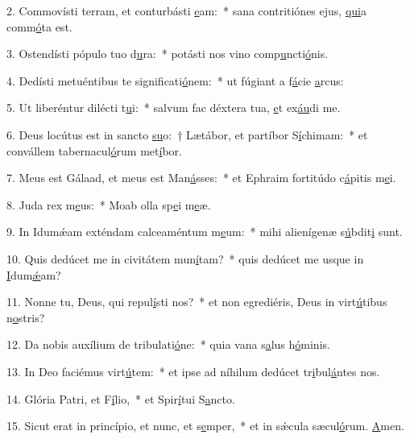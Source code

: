 2. Commovísti terram, et conturbásti \uline{e}am:~* sana contritiónes ejus, \uline{qui}a comm\uline{ó}ta est.\par 
3. Ostendísti pópulo tuo d\uline{u}ra:~* potásti nos vino comp\uline{u}ncti\uline{ó}nis.\par 
4. Dedísti metuéntibus te significati\uline{ó}nem:~* ut fúgiant a f\uline{á}cie \uline{a}rcus:\par 
5. Ut liberéntur dilécti t\uline{u}i:~* salvum fac déxtera tua, \uline{e}t ex\uline{áu}di me.\par 
6. Deus locútus est in sancto \uline{su}o:~† Lætábor, et partíbor S\uline{í}chimam:~* et convállem tabernacul\uline{ó}rum met\uline{í}bor.\par 
7. Meus est Gálaad, et meus est Man\uline{á}sses:~* et Ephraim fortitúdo c\uline{á}pitis m\uline{e}i.\par 
8. Juda rex m\uline{e}us:~* Moab olla sp\uline{e}i m\uline{e}æ.\par 
9. In Idumǽam exténdam calceaméntum m\uline{e}um:~* mihi alienígenæ s\uline{ú}bdit\uline{i} sunt.\par 
10. Quis dedúcet me in civitátem mun\uline{í}tam?~* quis dedúcet me usque in \uline{I}dum\uline{ǽ}am?\par 
11. Nonne tu, Deus, qui repul\uline{í}sti nos?~* et non egrediéris, Deus in virt\uline{ú}tibus n\uline{o}stris?\par 
12. Da nobis auxílium de tribulati\uline{ó}ne:~* quia vana s\uline{a}lus h\uline{ó}minis.\par 
13. In Deo faciémus virt\uline{ú}tem:~* et ipse ad níhilum dedúcet tr\uline{i}bul\uline{á}ntes nos.\par 
14. Glória Patri, et F\uline{í}lio,~* et Spir\uline{í}tui S\uline{a}ncto.\par 
15. Sicut erat in princípio, et nunc, et s\uline{e}mper,~* et in sǽcula sæcul\uline{ó}rum. \uline{A}men.\par 
